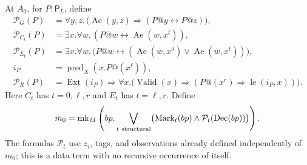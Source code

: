 \begin{definition}
\label{rel-specialized-object}
At \(A_0\), for \(P:\mathsf P_L\), define
\[
\begin{aligned}
 \mathcal P_G(P)&=\forall y,z.\,
  \bigl(\operatorname{Ae}(y,z)\Rightarrow(P@y\leftrightarrow P@z)\bigr),\\
 \mathcal P_{C_t}(P)&=\exists x.\forall w.\,
                    (P@w\leftrightarrow\operatorname{Ae}(w,x^t)),\\
 \mathcal P_{E_t}(P)&=\exists x.\forall w.\,
       \bigl(P@w\leftrightarrow
        (\operatorname{Ae}(w,x^0)\lor\operatorname{Ae}(w,x^t))\bigr),\\
 i_P&=\operatorname{pred}_X(x.P@(x^\ell)),\\
 \mathcal P_R(P)&=\operatorname{Ext}(i_P)\Rightarrow
     \forall x.\bigl(\operatorname{Valid}(x)\Rightarrow
                    (P@(x^r)\Rightarrow \operatorname{le}(i_P,x))\bigr).
\end{aligned}
\]
Here \(C_t\) has \(t=0,\ell,r\) and \(E_t\) has \(t=\ell,r\).
Define
\[
 m_0=\operatorname{mk}_M
   \left(bp.\bigvee_{t\ {\rm structural}}
       \bigl(\operatorname{Mark}_t(bp)\land
                       \mathcal P_t(\operatorname{Dec}(bp))\bigr)\right).
\]
The formulas \(\mathcal P_t\) use \(z_i\), tags, and observations
already defined independently of \(m_0\); this is a data term
with no recursive occurrence of itself.
\end{definition}

